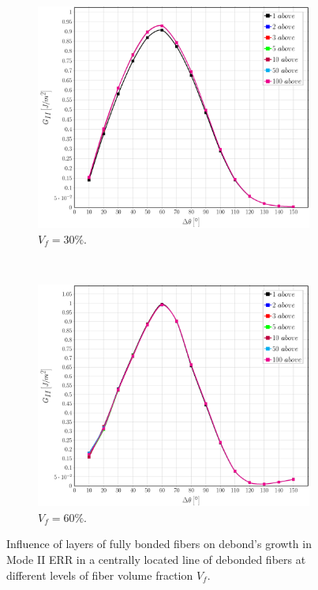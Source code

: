 \documentclass[review]{elsarticle}
\begin{document}
\begin{figure}[!h]
\centering
    \begin{subfigure}[b]{0.45\textwidth}
        \includegraphics[width=\textwidth]{abovefibers-vf30-GII.pdf}
        \caption{$V_{f}=30\%$.}\label{subfig:abovefiber30MII}
    \end{subfigure} ~
    \begin{subfigure}[b]{0.45\textwidth}
        \includegraphics[width=\textwidth]{abovefibers-vf60-GII.pdf}
        \caption{$V_{f}=60\%$.}\label{subfig:abovefiber60MII}
    \end{subfigure}

\caption{Influence of layers of fully bonded fibers on debond's growth in Mode II ERR in a centrally located line of debonded fibers at different levels of fiber volume fraction $V_{f}$.}\label{fig:abovefibersMII}
\end{figure}
\end{document}
